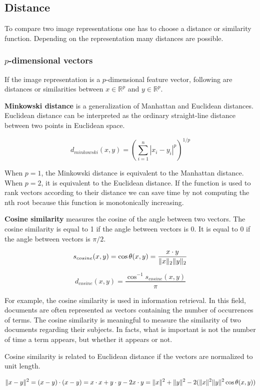 \subsection{Distance}
To compare two image representations one has to choose a distance or similarity function. Depending on the representation many distances are possible.

\subsubsection{$p$-dimensional vectors}
If the image representation is a $p$-dimensional feature vector, following are distances or similarities between $x\in\mathbb{R}^{p}$ and $y\in\mathbb{R}^{p}$.

\textbf{Minkowski distance} is a generalization of Manhattan and Euclidean distances. Euclidean distance can be interpreted as the ordinary straight-line distance between two points in Euclidean space.

\[d_{minkowski}(x, y)=\left(\sum_{i=1}^n |x_i-y_i|^p\right)^{1/p}\]

When $p=1$, the Minkowski distance is equivalent to the Manhattan distance. When $p=2$, it is equivalent to the Euclidean distance. If the function is used to rank vectors according to their distance we can save time by not computing the nth root because this function is monotonically increasing.

\textbf{Cosine similarity} measures the cosine of the angle between two vectors. The cosine similarity is equal to 1 if the angle between vectors is 0. It is equal to 0 if the angle between vectors is $\pi/2$. 

\[s_{cosine}(x, y)=\cos{\theta{}(x, y)}=\frac{x\cdot{}y}{\lVert x\rVert_2\lVert y\rVert_2}\]

\[d_{cosine}(x, y)=\frac{\cos^{-1}s_{cosine}(x, y)}{\pi}\]

For example, the cosine similarity is used in information retrieval. In this field, documents are often represented as vectors containing the number of occurrences of terms. The cosine similarity is meaningful to measure the similarity of two documents regarding their subjects. In facts, what is important is not the number of time a term appears, but whether it appears or not.

Cosine similarity is related to Euclidean distance if the vectors are normalized to unit length.

\[\lVert x-y\rVert^2=(x-y)\cdot{}(x-y)=x\cdot{x}+y\cdot{y}-2x\cdot{y}=\lVert x\rVert^2+\lVert y\rVert^2-2(\lVert x\rVert^2\lVert y\rVert^2\cos{\theta{(x, y)}})\]


